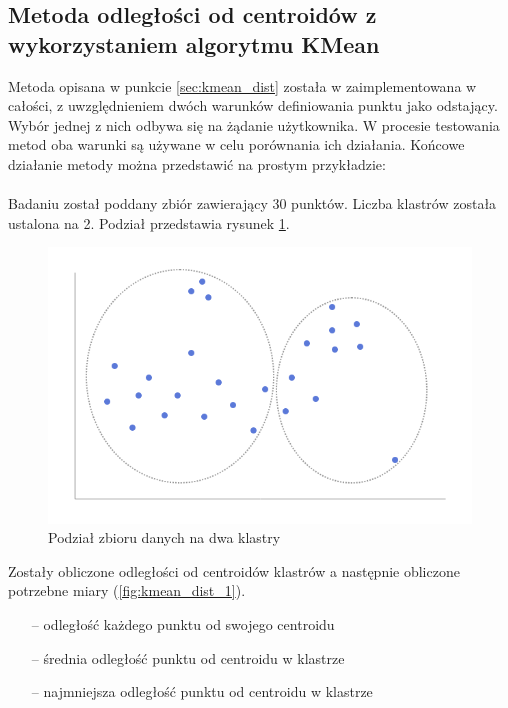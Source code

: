\documentclass[eng,printmode]{mgr}
\begin{document}
\subsection{Metoda odległości od centroidów z wykorzystaniem algorytmu KMean}
Metoda opisana w punkcie \ref{sec:kmean_dist} została w zaimplementowana w całości, z uwzględnieniem dwóch warunków definiowania punktu jako odstający. Wybór jednej z nich odbywa się na żądanie użytkownika. W procesie testowania metod oba warunki są używane w celu porównania ich działania. Końcowe działanie metody można przedstawić na prostym przykładzie:
\\\\
Badaniu został poddany zbiór zawierający 30 punktów. Liczba klastrów została ustalona na 2. Podział przedstawia rysunek \ref{fig:kmean_dist}.
\begin{figure}[H]
  \begin{center}
    \includegraphics[scale=0.5]{kmean_dist}
        \caption{Podział zbioru danych na dwa klastry}
        \label{fig:kmean_dist}
  \end{center}
\end{figure}
Zostały obliczone odległości od centroidów klastrów a następnie obliczone potrzebne miary (\ref{fig:kmean_dist_1}).
\begin{itemize}
  \item[--] odległość każdego punktu od swojego centroidu
  \item[--] średnia odległość punktu od centroidu w klastrze
  \item[--] najmniejsza odległość punktu od centroidu w klastrze
\end{itemize}
\end{document}
